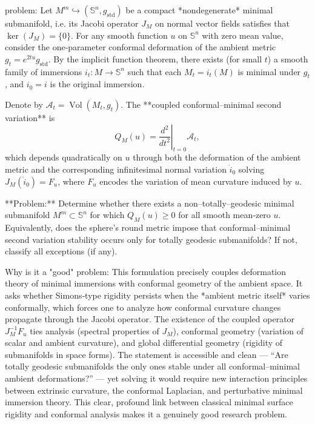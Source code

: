 problem:  
Let \( M^m \hookrightarrow (\mathbb{S}^n, g_{\mathrm{std}}) \) be a compact *nondegenerate* minimal submanifold, i.e. its Jacobi operator \(J_M\) on normal vector fields satisfies that \(\ker(J_M)=\{0\}\).  
For any smooth function \(u\) on \(\mathbb{S}^n\) with zero mean value, consider the one‑parameter conformal deformation of the ambient metric \(g_t = e^{2t u} g_{\mathrm{std}}\). By the implicit function theorem, there exists (for small \(t\)) a smooth family of immersions \(i_t: M \to \mathbb{S}^n\) such that each \(M_t=i_t(M)\) is minimal under \(g_t\), and \(i_0=i\) is the original immersion.  

Denote by \(\mathcal A_t = \operatorname{Vol}(M_t,g_t)\).  
The **coupled conformal–minimal second variation** is  
\[
Q_M(u) = \left.\frac{d^2}{dt^2}\right|_{t=0} \mathcal A_t ,
\]
which depends quadratically on \(u\) through both the deformation of the ambient metric and the corresponding infinitesimal normal variation \(\dot i_0\) solving \(J_M(\dot i_0)=F_u\), where \(F_u\) encodes the variation of mean curvature induced by \(u\).  

**Problem:**  
Determine whether there exists a non–totally–geodesic minimal submanifold \(M^m \subset \mathbb{S}^n\) for which \(Q_M(u)\ge 0\) for all smooth mean‑zero \(u\). Equivalently, does the sphere’s round metric impose that conformal–minimal second variation stability occurs only for totally geodesic submanifolds? If not, classify all exceptions (if any).  

Why is it a "good" problem:  
This formulation precisely couples deformation theory of minimal immersions with conformal geometry of the ambient space. It asks whether Simons‑type rigidity persists when the *ambient metric itself* varies conformally, which forces one to analyze how conformal curvature changes propagate through the Jacobi operator. The existence of the coupled operator \(J_M^{-1}\!F_u\) ties analysis (spectral properties of \(J_M\)), conformal geometry (variation of scalar and ambient curvature), and global differential geometry (rigidity of submanifolds in space forms).  
The statement is accessible and clean — “Are totally geodesic submanifolds the only ones stable under all conformal–minimal ambient deformations?” — yet solving it would require new interaction principles between extrinsic curvature, the conformal Laplacian, and perturbative minimal immersion theory. This clear, profound link between classical minimal surface rigidity and conformal analysis makes it a genuinely good research problem.